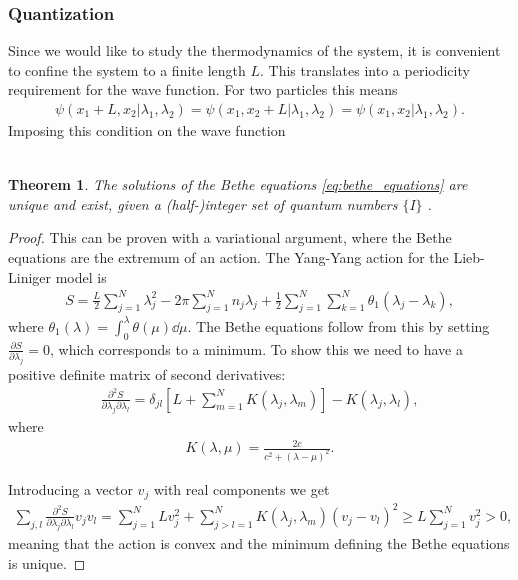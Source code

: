 \documentclass[11pt, a4paper,draft]{report} %
\newtheorem{theorem}{Theorem}
\begin{document}
\subsubsection{Quantization}

Since we would like to study the thermodynamics of the system, it is convenient to confine the system to a finite length \(L\).
This translates into a periodicity requirement for the wave function.
For two particles this means
\begin{align}
	\psi(x_1+L,x_2|\lambda_1,\lambda_2) = \psi(x_1,x_2+L|\lambda_1,\lambda_2) = \psi(x_1,x_2|\lambda_1,\lambda_2).
\end{align}
Imposing this condition on the wave function

\begin{align}\label{eq:bethe_equations}
\end{align}

\begin{theorem}
\begin{sloppypar}
\noindent
The solutions of the Bethe equations \cref{eq:bethe_equations} are unique and exist, given a \mbox{(half-)integer} set of quantum numbers \(\{I\}\) \textrm{\cite{Yang1969}}.
\end{sloppypar}
\end{theorem}

\begin{proof}
This can be proven with a variational argument, where the Bethe equations are the extremum of an action.
The Yang-Yang action for the Lieb-Liniger model is
\begin{align}
	S= \frac{L}{2} \sum_{j=1}^{N} \lambda_j^2 - 2\pi\sum_{j=1}^{N} n_j \lambda_j + \frac{1}{2} \sum_{j=1}^N \sum_{k=1}^{N} \theta_1(\lambda_j - \lambda_k),
\end{align}
where \(\theta_1(\lambda) = \int_0^{\lambda} \theta(\mu)\dd\mu\).
The Bethe equations follow from this by setting \(\frac{\partial S}{\partial \lambda_j} = 0\), which corresponds to a minimum.
To show this we need to have a positive definite matrix of second derivatives:
\begin{align}
	\frac{\partial^2S}{\partial\lambda_j\partial\lambda_l} = \delta_{jl} \left[L + \sum_{m=1}^{N} K(\lambda_j,\lambda_m)\right] - K(\lambda_j, \lambda_l),
\end{align}
where 
\begin{align}
	K(\lambda, \mu) = \frac{2c}{c^2 + (\lambda - \mu)^2}.
\end{align}

Introducing a vector \(v_j\) with real components we get \cite{Korepin1993}
\begin{align}
  	\sum_{j,l}\frac{\partial^2S}{\partial\lambda_j\partial\lambda_l} v_jv_l = \sum_{j=1}^NL v_j^2 + \sum_{j>l=1}^{N} K(\lambda_j,\lambda_m) (v_j - v_l)^2 \geq L \sum_{j=1}^Nv_j^2 > 0,
\end{align}
meaning that the action is convex and the minimum defining the Bethe equations is unique.
\end{proof}
\end{document}
